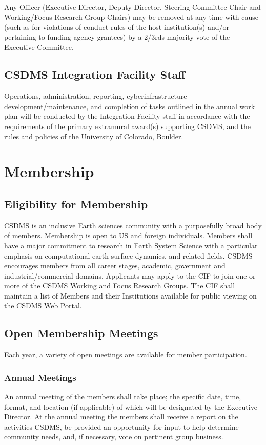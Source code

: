 \documentclass[11pt, oneside]{article}   	%
\def\article#1{
\renewcommand{\thesection}{Article \Roman{section}} 
\section[Article]{#1}
\renewcommand{\thesection}{\Roman{section}} 
}
\begin{document}
Any Officer (Executive Director, Deputy Director, Steering Committee Chair and Working/Focus Research Group Chairs) may be removed at any time with cause (such as for violations of conduct rules of the host institution(s) and/or pertaining to funding agency grantees) by a 2/3rds majority vote of the Executive Committee.


\subsection{CSDMS Integration Facility Staff}

Operations, administration, reporting, cyberinfrastructure development/maintenance, and completion of tasks outlined in the annual work plan will be conducted by the Integration Facility staff in accordance with the requirements of the primary extramural award(s) supporting CSDMS, and the rules and policies of the University of Colorado, Boulder.


\article{Membership}


\subsection{Eligibility for Membership}

CSDMS is an inclusive Earth sciences community with a purposefully broad body of members. Membership is open to US and foreign individuals. Members shall have a major commitment to research in Earth System Science with a particular emphasis on computational earth-surface dynamics, and related fields. CSDMS encourages members from all career stages, academic, government and industrial/commercial domains. Applicants may apply to the CIF to join one or more of the CSDMS Working and Focus Research Groups. The CIF shall maintain a list of Members and their Institutions available for public viewing on the CSDMS Web Portal.


\subsection{Open Membership Meetings} Each year, a variety of open meetings are available for member participation.

\subsubsection{Annual Meetings} 

An annual meeting of the members shall take place; the specific date, time, format, and location (if applicable) of which will be designated by the Executive Director.  At the annual meeting the members shall receive a report on the activities CSDMS, be provided an opportunity for input to help determine community needs, and, if necessary, vote on pertinent group business.
\end{document}
